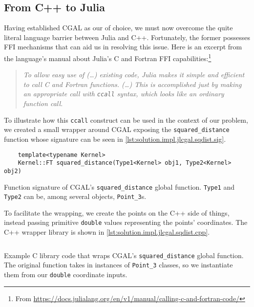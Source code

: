 \subsection{From C++ to Julia}%
\label{sec:solution.impl.jlcgal}

Having established \ac{CGAL} as our \geomlibrary{} of choice, we must now
overcome the quite literal language barrier between Julia and C++.  Fortunately,
the former possesses \ac{FFI} mechanisms that can aid us in resolving this
issue.  Here is an excerpt from the language's manual about Julia's C and
Fortran \ac{FFI} capabilities:\footnote{From
\url{https://docs.julialang.org/en/v1/manual/calling-c-and-fortran-code/}}

\begin{quote}
  \itshape\color{gray}
  To allow easy use of (\ldots) existing code, Julia makes it simple and
  efficient to call C and Fortran functions.  (\ldots) This is accomplished just
  by making an appropriate call with \texttt{ccall} syntax, which
  looks like an ordinary function call.
\end{quote}

To illustrate how this \texttt{ccall} construct can be used in the
context of our problem, we created a small wrapper around \ac{CGAL} exposing the
\texttt{squared\_distance} function whose signature can be seen in
\cref{lst:solution.impl.jlcgal.sqdist.sig}.
\begin{listing}[htb]
  \begin{verbatim}
    template<typename Kernel>
    Kernel::FT squared_distance(Type1<Kernel> obj1, Type2<Kernel> obj2) 
  \end{verbatim}
  \caption[\texttt{squared\_distance} function signature]{
    Function signature of \ac{CGAL}'s \texttt{squared\_distance} global
    function.  \texttt{Type1} and \texttt{Type2} can be, among several objects,
    \texttt{Point\_3}s.}%
  \label{lst:solution.impl.jlcgal.sqdist.sig}
\end{listing}
To facilitate the wrapping, we create the points on the C++ side of things,
instead passing primitive \texttt{double} values representing the
points' coordinates.  The C++ wrapper library is shown in
\cref{lst:solution.impl.jlcgal.sqdist.cpp}.

\begin{listing}[htb]
  \inputminted{cpp}{cpp/sqdist.cpp}
  \caption[C wrapper for squared distance functionality]{
    Example C library code that wraps \ac{CGAL}'s \texttt{squared\_distance}
    global function.  The original function takes in instances of
    \texttt{Point\_3} classes, so we instantiate them from our
    \texttt{double} coordinate inputs.}%
  \label{lst:solution.impl.jlcgal.sqdist.cpp}
\end{listing}


